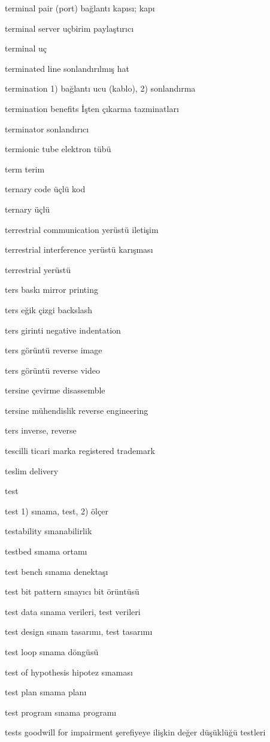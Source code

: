 \documentclass[12pt,fleqn]{article}\usepackage{../../common}
\begin{document}
terminal pair (port) bağlantı kapısı; kapı

terminal server uçbirim paylaştırıcı

terminal uç

terminated line sonlandırılmış hat

termination 1) bağlantı ucu (kablo), 2) sonlandırma

termination benefits İşten çıkarma tazminatları

terminator sonlandırıcı

termionic tube elektron tübü

term terim

ternary code üçlü kod

ternary üçlü

terrestrial communication yerüstü iletişim

terrestrial interference yerüstü karışması

terrestrial yerüstü

ters baskı mirror printing

ters eğik çizgi backslash

ters girinti negative indentation

ters görüntü reverse image

ters görüntü reverse video

tersine çevirme disassemble

tersine mühendislik reverse engineering

ters inverse, reverse

tescilli ticari marka registered trademark

teslim delivery

test

test 1) sınama, test, 2) ölçer

testability sınanabilirlik

testbed sınama ortamı

test bench sınama denektaşı

test bit pattern sınayıcı bit örüntüsü

test data sınama verileri, test verileri

test design sınam tasarımı, test tasarımı

test loop sınama döngüsü

test of hypothesis hipotez sınaması

test plan sınama planı

test program sınama programı

tests goodwill for impairment şerefiyeye ilişkin değer düşüklüğü testleri
\end{document}
